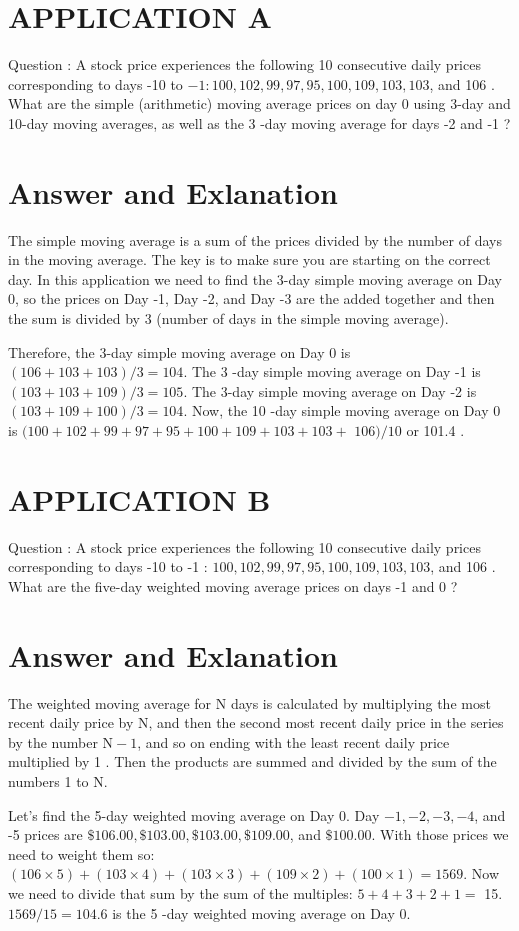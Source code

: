 \documentclass[11pt]{article}
\begin{document}
\section*{APPLICATION A}
Question : A stock price experiences the following 10 consecutive daily prices corresponding to days -10 to $-1: 100,102,99,97,95,100,109,103,103$, and 106 . What are the simple (arithmetic) moving average prices on day 0 using 3-day and 10-day moving averages, as well as the 3 -day moving average for days -2 and -1 ?

\section*{Answer and Exlanation}
The simple moving average is a sum of the prices divided by the number of days in the moving average. The key is to make sure you are starting on the correct day. In this application we need to find the 3-day simple moving average on Day 0, so the prices on Day -1, Day -2, and Day -3 are the added together and then the sum is divided by 3 (number of days in the simple moving average).

Therefore, the 3-day simple moving average on Day 0 is $(106+103+103) / 3=104$. The 3 -day simple moving average on Day -1 is $(103+103+109) / 3=105$. The 3-day simple moving average on Day -2 is $(103+109+100) / 3=104$. Now, the 10 -day simple moving average on Day 0 is $(100+102+99+97+95+100+109+103+103+$ $106) / 10$ or 101.4 .

\section*{APPLICATION B}
Question : A stock price experiences the following 10 consecutive daily prices corresponding to days -10 to -1 : $100,102,99,97,95,100,109,103,103$, and 106 . What are the five-day weighted moving average prices on days -1 and 0 ?

\section*{Answer and Exlanation}
The weighted moving average for $\mathrm{N}$ days is calculated by multiplying the most recent daily price by $\mathrm{N}$, and then the second most recent daily price in the series by the number $\mathrm{N}-1$, and so on ending with the least recent daily price multiplied by 1 . Then the products are summed and divided by the sum of the numbers 1 to $\mathrm{N}$.

Let's find the 5-day weighted moving average on Day 0. Day $-1,-2,-3,-4$, and -5 prices are $\$ 106.00, \$ 103.00, \$ 103.00, \$ 109.00$, and $\$ 100.00$. With those prices we need to weight them so: $(106 \times 5)+(103 \times 4)+(103 \times 3)+(109 \times 2)+(100 \times 1)=1569$. Now we need to divide that sum by the sum of the multiples: $5+4+3+2+1=$ 15. $1569 / 15=104.6$ is the 5 -day weighted moving average on Day 0.
\end{document}
